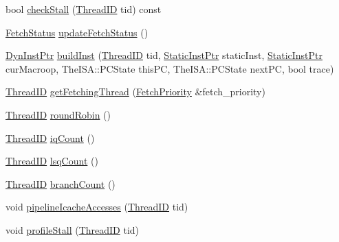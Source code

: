 \begin{DoxyCompactItemize}
\item 
bool \hyperlink{classDefaultFetch_a6ba4f2f95d991f5be818dabf7500feed}{checkStall} (\hyperlink{base_2types_8hh_ab39b1a4f9dad884694c7a74ed69e6a6b}{ThreadID} tid) const 
\item 
\hyperlink{classDefaultFetch_a64605db3d589dcf77a170612ff89515e}{FetchStatus} \hyperlink{classDefaultFetch_ac244c54ec94dd5e1d886dfd022752ec8}{updateFetchStatus} ()
\item 
\hyperlink{classDefaultFetch_a028ce10889c5f6450239d9e9a7347976}{DynInstPtr} \hyperlink{classDefaultFetch_a9c38c3c5f6bb4a7c1919ca7d3d4e12dc}{buildInst} (\hyperlink{base_2types_8hh_ab39b1a4f9dad884694c7a74ed69e6a6b}{ThreadID} tid, \hyperlink{classRefCountingPtr}{StaticInstPtr} staticInst, \hyperlink{classRefCountingPtr}{StaticInstPtr} curMacroop, TheISA::PCState thisPC, TheISA::PCState nextPC, bool trace)
\item 
\hyperlink{base_2types_8hh_ab39b1a4f9dad884694c7a74ed69e6a6b}{ThreadID} \hyperlink{classDefaultFetch_a4a20466270bc79a695af63ea67a35576}{getFetchingThread} (\hyperlink{classDefaultFetch_a818d5f50fdcec74a1a445b4fa8b760e3}{FetchPriority} \&fetch\_\-priority)
\item 
\hyperlink{base_2types_8hh_ab39b1a4f9dad884694c7a74ed69e6a6b}{ThreadID} \hyperlink{classDefaultFetch_a8aab9cacbc483081596b13ecd5192eb5}{roundRobin} ()
\item 
\hyperlink{base_2types_8hh_ab39b1a4f9dad884694c7a74ed69e6a6b}{ThreadID} \hyperlink{classDefaultFetch_a4aff2ae442aa43bcb382774f7c429030}{iqCount} ()
\item 
\hyperlink{base_2types_8hh_ab39b1a4f9dad884694c7a74ed69e6a6b}{ThreadID} \hyperlink{classDefaultFetch_a2cce05272516009508e173f69d7d37df}{lsqCount} ()
\item 
\hyperlink{base_2types_8hh_ab39b1a4f9dad884694c7a74ed69e6a6b}{ThreadID} \hyperlink{classDefaultFetch_adbe8a1ec70863059cb0e121edc864a14}{branchCount} ()
\item 
void \hyperlink{classDefaultFetch_a80cf75d186616b207a78a162498d1012}{pipelineIcacheAccesses} (\hyperlink{base_2types_8hh_ab39b1a4f9dad884694c7a74ed69e6a6b}{ThreadID} tid)
\item 
void \hyperlink{classDefaultFetch_ab3fa3c541f25b65e1b61d7290712e507}{profileStall} (\hyperlink{base_2types_8hh_ab39b1a4f9dad884694c7a74ed69e6a6b}{ThreadID} tid)
\end{DoxyCompactItemize}
